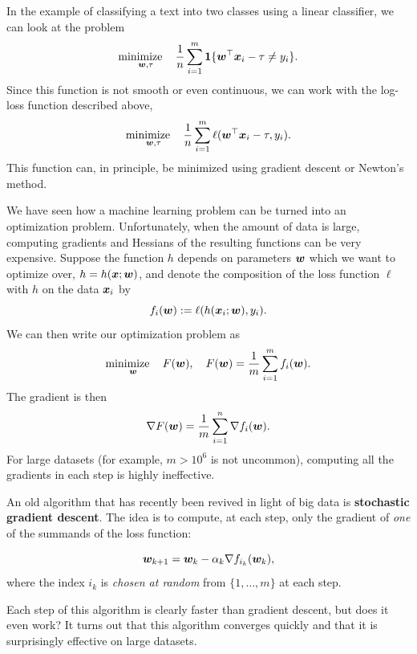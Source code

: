 \begin{example}
In the example of classifying a text into two classes using a linear classifier, we can look at the problem
\begin{equation*}
 \mathop{\text{minimize}\quad}_{\bm{w}, \tau} \frac{1}{n}\sum_{i=1}^m \mathbf{1}\{\bm{w}^{\top}\bm{x}_i-\tau \neq y_i\}.
\end{equation*}
Since this function is not smooth or even continuous, we can work with the log-loss function described above,
\begin{equation*}
\mathop{\text{minimize}\quad}_{\bm{w}, \tau} \frac{1}{n} \sum_{i=1}^m \ell(\bm{w}^{\top}\bm{x}_i-\tau, y_i).
\end{equation*}
This function can, in principle, be minimized using gradient descent or Newton's method. 
\end{example}

We have seen how a machine learning problem can be turned into an optimization problem. Unfortunately, when the amount of data is large, computing gradients and Hessians of the resulting functions can be very expensive. Suppose the function $h$ depends on parameters $\bm{w}$ which we want to optimize over, $h=h(\bm{x}; \bm{w})$, and denote the composition of the loss function $\ell$ with $h$ on the data $\bm{x}_i$ by
\begin{equation*}
  f_i(\bm{w}) := \ell(h(\bm{x}_i; \bm{w}),y_i).
\end{equation*}
We can then write our optimization problem as
\begin{equation*}
  \mathop{\text{minimize}\quad}_{\bm{w}} F(\bm{w}), \quad F(\bm{w}) = \frac{1}{m} \sum_{i=1}^m f_i(\bm{w}).
\end{equation*}
The gradient is then
\begin{equation*}
  \nabla F(\bm{w}) = \frac{1}{m} \sum_{i=1}^n \nabla f_i(\bm{w}).
\end{equation*}
For large datasets (for example, $m>10^6$ is not uncommon), computing all the gradients in each step is highly ineffective.

An old algorithm that has recently been revived in light of big data is \textbf{stochastic gradient descent}. The idea is to compute, at each step, only the gradient of {\em one} of the summands of the loss function:

\begin{equation*}
  \bm{w}_{k+1} = \bm{w}_k-\alpha_k \nabla f_{i_k}(\bm{w}_k),
\end{equation*}
where the index $i_k$ is {\em chosen at random} from $\{1,\dots,m\}$ at each step. 

Each step of this algorithm is clearly faster than gradient descent, but does it even work? It turns out that this algorithm converges quickly and that it is surprisingly effective on large datasets.


